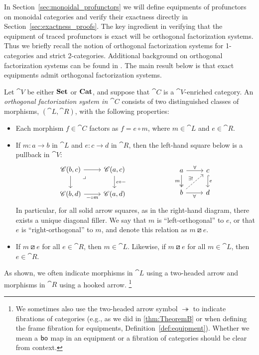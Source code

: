 \documentclass[11pt,oneside,article]{memoir}
\begin{document}
In Section~\ref{sec:monoidal_profunctors} we will define equipments of profunctors on monoidal
categories and verify their exactness directly in Section~\ref{sec:exactness_proofs}. The key
ingredient in verifying that the equipment of traced profunctors is exact will be orthogonal
factorization systems. Thus we briefly recall the notion of orthogonal factorization systems for
1-categories and strict 2-categories. Additional background on orthogonal factorization systems can
be found in \cite[Chapter 5.5]{BorceuxV1}. The main result below is that exact equipments admit
orthogonal factorization systems.

\begin{definition}
    \label{def:orthogonal}
  Let $\cat{V}$ be either $\mathbf{Set}$ or $\mathbf{Cat}$, and suppose that $\cat{C}$ is a $\cat{V}$-enriched
  category. An \emph{orthogonal factorization system in $\cat{C}$} consists of two distinguished
  classes of morphisms, $(\cat{L},\cat{R})$, with the following properties:
  \begin{itemize}
    \item Each morphism $f\in\cat{C}$ factors as $f=e\circ m$, where $m\in\cat{L}$ and
      $e\in\cat{R}$.
    \item If $m\colon a\to b$ in $\cat{L}$ and $e\colon c\to d$ in $\cat{R}$, then the left-hand
      square below is a pullback in $\cat{V}$:
      \begin{equation}
          \label{eqn:OrthFactSys}
        \begin{tikzcd}
          \cat{C}(b,c)\ar[r]\ar[d]\ar[rd,phantom,"\lrcorner" very near start]&\cat{C}(a,c)\ar[d,"e\circ -"]\\
          \cat{C}(b,d)\ar[r,"-\circ m"']&\cat{C}(a,d)
        \end{tikzcd}
        \hspace{.9in}
        \begin{tikzcd}
          a\ar[r,"\forall"]\ar[d,two heads,"m"']&c\ar[d,hook, "e"]\\
          b\ar[r,"\forall"']\ar[ur,dashed,"\exists!"]&d
        \end{tikzcd}
      \end{equation}
      In particular, for all solid arrow squares, as in the right-hand diagram, there exists a
      unique diagonal filler. We say that $m$ is ``left-orthogonal'' to $e$, or that $e$ is
      ``right-orthogonal'' to $m$, and denote this relation as $m\boxslash e$.
    \item If $m\boxslash e$ for all $e\in\cat{R}$, then $m\in\cat{L}$. Likewise, if $m\boxslash e$
      for all $m\in\cat{L}$, then $e\in\cat{R}$.
  \end{itemize}
  As shown, we often indicate morphisms in $\cat{L}$ using a two-headed arrow and morphisms in
  $\cat{R}$ using a hooked arrow.%
  \footnote{
    We sometimes also use the two-headed arrow symbol $\twoheadrightarrow$
    to indicate fibrations of categories (e.g., as we did in \ref{thm:TheoremB} or
    when defining the frame fibration for equipments, Definition~\ref{def:equipment}). Whether
    we mean a $\mathsf{bo}$ map in an equipment or a fibration of categories should be clear from context.
  }
\end{definition}
\end{document}
